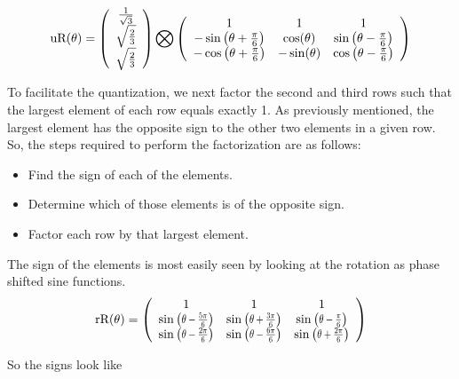 \begin{equation}
\text{uR}(\theta) =
\left(
\begin{array}{c}
 \frac{1}{\sqrt{3}} \\
 \sqrt{\frac{2}{3}}  \\
 \sqrt{\frac{2}{3}} \\
\end{array}
\right) \bigotimes
\left(
\begin{array}{ccc}
 1 & 1 & 1 \\
 -\sin \left(\theta +\frac{\pi}{6}\right) &  \cos (\theta ) &  \sin \left(\theta -\frac{\pi}{6}\right) \\
 -\cos \left(\theta +\frac{\pi}{6}\right) & - \sin (\theta ) & \cos \left(\theta -\frac{\pi}{6}\right) \\
\end{array}
\right)
\end{equation}

To facilitate the quantization, we next factor the second and third rows such that the largest element of each row equals exactly 1. As previously mentioned, the largest element has the opposite sign to the other two elements in a given row. So, the steps required to perform the factorization are as follows:

\begin{itemize}
\item{Find the sign of each of the elements.}
\item{Determine which of those elements is of the opposite sign.}
\item{Factor each row by that largest element.}
\end{itemize}

The sign of the elements is most easily seen by looking at the rotation as phase shifted sine functions.
\begin{equation}
\text{rR}(\theta )=\left(
\begin{array}{ccc}
 1 & 1 & 1 \\
 \sine{\theta -\frac{5 \pi }{6}}  & \sine{\theta +\frac{3 \pi }{6}}  & \sine{\theta -\Pii{6}}  \\
 \sine{\theta -\frac{2 \pi }{6}}  & \sine{\theta -\frac{6 \pi }{6}}  & \sine{\theta +\frac{2 \pi }{6}}  \\
\end{array}
\right)
\end{equation}

So the signs look like

